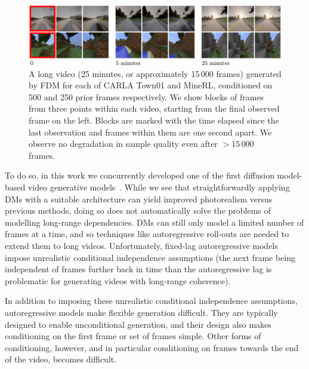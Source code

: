 \begin{figure}[t]
    \centering
    \includegraphics[width=\textwidth]{figs/fdm/fig1.pdf}
    \caption{A long video (25 minutes, or approximately 15\,000 frames) generated by FDM for each of CARLA Town01 and MineRL, conditioned on 500 and 250 prior frames respectively. We show blocks of frames from three points within each video, starting from the final observed frame on the left. Blocks are marked with the time elapsed since the last observation and frames within them are one second apart. We observe no degradation in sample quality even after $>15\,000$ frames.}
    \label{fig:fdm-1}
\end{figure}

To do so, in this work we concurrently developed one of the first diffusion model-based video generative models~\cite{ho2022video,yang2022diffusion,voleti2022mcvd}. While we see that straightforwardly applying DMs with a suitable architecture can yield improved photorealism versus previous methods, doing so does not automatically solve the problems of modelling long-range dependencies. DMs can still only model a limited number of frames at a time, and so techniques like autoregressive roll-outs are needed to extend them to long videos. Unfortunately, fixed-lag autoregressive models impose unrealistic conditional independence assumptions (the next frame being independent of frames further back in time than the autoregressive lag is problematic for generating videos with long-range coherence).  

In addition to imposing these unrealistic conditional independence assumptions, autoregressive models make flexible generation difficult. They are typically designed to enable unconditional generation, and their design also makes conditioning on the first frame or set of frames simple. Other forms of conditioning, however, and in particular conditioning on frames towards the end of the video, becomes difficult.


